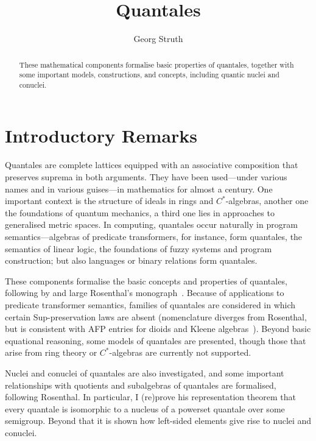 \documentclass[11pt,a4paper]{article}
\begin{document}
\title{Quantales}
\author{Georg Struth}
\maketitle

\begin{abstract}
  These mathematical components formalise basic properties of
  quantales, together with some important models, constructions, and
  concepts, including quantic nuclei and conuclei.
\end{abstract}

\tableofcontents

\section{Introductory Remarks}

Quantales are complete lattices equipped with an associative
composition that preserves suprema in both arguments.  They have been
used---under various names and in various guises---in mathematics for
almost a century. One important context is the structure of ideals in
rings and $C^\ast$-algebras, another one the foundations of quantum
mechanics, a third one lies in approaches to generalised metric
spaces. In computing, quantales occur naturally in program
semantics---algebras of predicate transformers, for instance, form
quantales, the semantics of linear logic, the foundations of fuzzy
systems and program construction; but also languages or binary
relations form quantales.

These components formalise the basic concepts and properties of
quantales, following by and large Rosenthal's
monograph~\cite{Rosenthal90}.  Because of applications to predicate
transformer semantics, families of quantales are considered in which
certain Sup-preservation laws are absent (nomenclature diverges from
Rosenthal, but is consistent with AFP entries for dioids and Kleene
algebras~\cite{ArmstrongSW13}).  Beyond basic equational reasoning,
some models of quantales are presented, though those that arise from
ring theory or $C^\ast$-algebras are currently not supported.

Nuclei and conuclei of quantales are also investigated, and some
important relationships with quotients and subalgebras of quantales
are formalised, following Rosenthal. In particular, I (re)prove his
representation theorem that every quantale is isomorphic to a nucleus
of a powerset quantale over some semigroup. Beyond that it is shown
how left-sided elements give rise to nuclei and conuclei.
\end{document}

